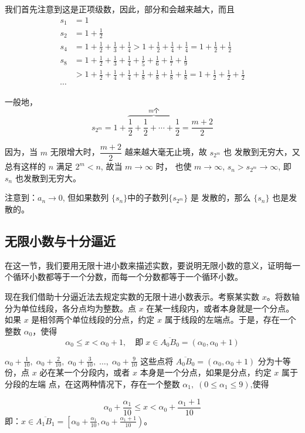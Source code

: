 \begin{solution}
  我们首先注意到这是正项级数，因此，部分和会越来越大，而且
\[\begin{split}
    s_1&=1          \\
    s_2&=1+\frac{1}{2}          \\
    s_4&=1+\frac{1}{2}+\frac{1}{3}+\frac{1}{4}>1+\frac{1}{2}+\frac{1}{4}+\frac{1}{4}=1+\frac{1}{2}+\frac{1}{2}          \\
    s_8&=1+\frac{1}{2}+\frac{1}{3}+\frac{1}{4}+\frac{1}{5}+\frac{1}{6}+\frac{1}{7}+\frac{1}{9}          \\
    &>1+\frac{1}{2}+\frac{1}{4}+\frac{1}{4}+\frac{1}{8}+\frac{1}{8}+\frac{1}{8}+\frac{1}{8}=1+\frac{1}{2}+\frac{1}{2}+\frac{1}{2}\\
    \cdots 
\end{split}\]

一般地，
\[s_{2^m}=1+\overbrace{\frac{1}{2}+\frac{1}{2}+\cdots +\frac{1}{2}}^{\text{$m$个}}=\frac{m+2}{2}\]    
{\linespread{1.5}\selectfont
因为，当 $m$ 无限增大时，$\dfrac{m+2}{2}$ 越来越大毫无止境，故 $s_{2^m}$ 也
发散到无穷大，又总有这样的 $n$ 满足 $2^m<n$, 故当 $m\to\infty$ 时，
也使 $m\to\infty$, $s_n>s_{2^m}\to \infty$, 即 $s_n$ 也发散到无穷大。\par}

注意到：$a_n\to 0$, 但如果数列 $\{s_n\}$中的子数列$\{s_{2^m}\}$ 是
发散的，那么 $\{s_n\}$ 也是发散的。
\end{solution}

\subsection{无限小数与十分逼近}
在这一节，我们要用无限十进小数来描述实数，要说明无限小数的意义，证明每一个循环小数都等于一个分数，而每一个分数都等于一个循环小数。

现在我们借助十分逼近法去规定实数的无限十进小数表示。考察某实数 $x$。将数轴分为单位线段，各分点均为整数。点 $x$ 在某一线段内，或者本身就是一个分点。如果 $x$ 是相邻两个单位线段的分点，约定 $x$ 属于线段的左端点。于是，存在一个整数 $\alpha_0$，使得
\[\alpha_0\le x<\alpha_0+1,\quad \text{即}\; x\in \overline{A_0B_0}=(\alpha_0,\alpha_0+1)\]

{\linespread{1.6}\selectfont$\displaystyle \alpha_0+\frac{1}{10},\; \alpha_0+\frac{2}{10},\; \alpha_0+\frac{3}{10},\;\ldots,\; \alpha_0+\frac{9}{10}$ 这些点将 $\overline{A_0B_0}=(\alpha_0,\alpha_0+1)$ 分为十等份，点 $x$ 必在某一个分段内，或者 $x$ 本身是一个分点，如果是分点，约定 $x$ 属于分段的左端
点，在这两种情况下，存在一个整数 $\alpha_1,\; (0\leqslant \alpha_1\leqslant 9)$,使得\par}
\[\alpha_0+\frac{\alpha_1}{10}\le x<\alpha_0+\frac{\alpha_1+1}{10}\]
即：$\displaystyle x\in\overline{A_1B_1}=\left[\alpha_0+\frac{\alpha_1}{10}, \alpha_0+\frac{\alpha_1+1}{10}\right)$。

